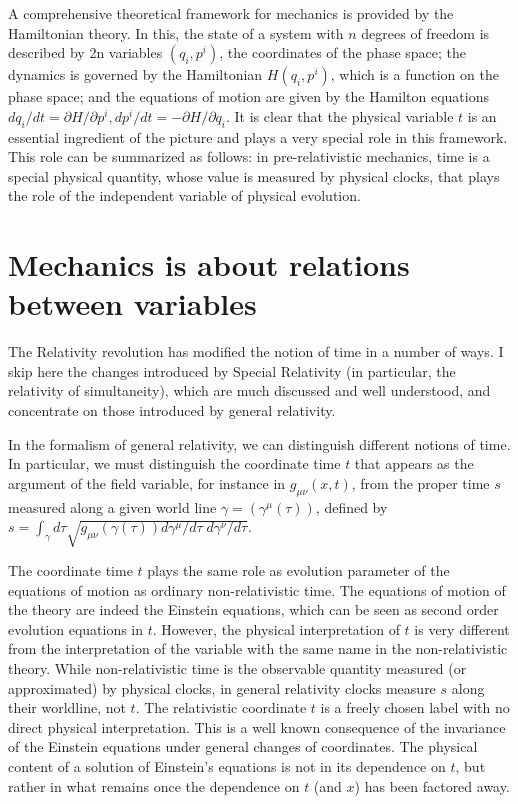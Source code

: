 \documentclass[10pt,nofootinbib]{revtex4}
\begin{document}
A comprehensive theoretical framework for mechanics is provided by the Hamiltonian theory.  In this, the state of a system with $n$ degrees of freedom is described by 2n variables $(q_i,p^i)$, the coordinates of the phase space; the dynamics is governed by the Hamiltonian $H(q_i,p^i)$, which is a function on the phase space; and the equations of motion are given by the Hamilton equations
$dq_i/dt=\partial H/\partial p^i, dp^i/dt=-\partial H/\partial q_i$. It is clear that the physical variable $t$ is an essential ingredient of the picture and plays a very special role in this framework.
This role can be summarized as follows:  in pre-relativistic mechanics, time is a special physical quantity, whose value is measured by physical clocks, that plays the role of the independent variable of physical evolution. 

\section{Mechanics is about relations between variables}
The Relativity revolution has modified the notion of time in a number of ways.  I skip here the changes introduced by Special Relativity (in particular, the relativity of simultaneity), which are much discussed and well understood, and concentrate on those  introduced by general relativity.   

In the formalism of general relativity, we can distinguish different notions of time. In particular, we must distinguish the coordinate time $t$ that appears as the argument of the field variable, for instance in $g_{\mu\nu}(x,t)$, from the proper time $s$ measured along a given world line $\gamma=(\gamma^\mu(\tau))$, defined by $s=\int_\gamma d\tau \sqrt{g_{\mu\nu}(\gamma(\tau))d\gamma^\mu/d\tau\; d\gamma^\nu/d\tau}.$

The coordinate time $t$ plays the same role as evolution parameter of the equations of motion as ordinary non-relativistic time.  The equations of motion of the theory are indeed the Einstein equations, which can be seen as second order evolution equations in $t$.  However, the physical interpretation of $t$ is very different from the interpretation of the variable with the same name in the non-relativistic theory.   While non-relativistic time is the observable quantity measured (or approximated) by physical clocks, in general relativity clocks measure $s$ along their worldline, not $t$. The relativistic coordinate $t$ is a freely chosen label with no direct physical interpretation.  This is a well known consequence of the invariance of the Einstein equations under general changes of coordinates.  The physical content of a solution of Einstein's equations is not in its dependence on $t$, but rather in what remains once the dependence on $t$ (and $x$) has been factored away. 
\end{document}

